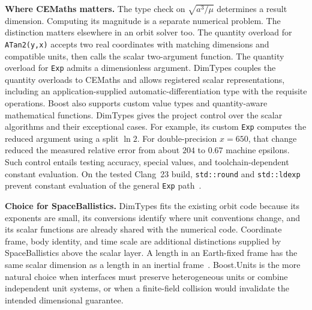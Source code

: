 \documentclass[11pt,a4paper]{article}
\newcommand{\code}[1]{\texttt{#1}}
\begin{document}
\textbf{Where CEMaths matters.}
The type check on $\sqrt{a^3/\mu}$ determines a result dimension.
Computing its magnitude is a separate numerical problem. The distinction
matters elsewhere in an orbit solver too. The quantity overload for
\code{ATan2(y,x)} accepts two real coordinates with matching dimensions and
compatible units, then calls the scalar two-argument function. The quantity
overload for \code{Exp} admits a dimensionless argument. DimTypes couples
the quantity overloads to CEMaths and allows registered scalar
representations, including an application-supplied automatic-differentiation
type with the requisite operations. Boost also supports custom value types
and quantity-aware mathematical functions. DimTypes gives the project control
over the scalar algorithms and their exceptional cases. For example, its
custom \code{Exp} computes the reduced argument using a split $\ln 2$.
For double-precision $x=650$, that change reduced the measured relative error
from about $204$ to $0.67$ machine epsilons. Such control entails testing
accuracy, special values, and toolchain-dependent constant evaluation. On
the tested Clang~23 build, \code{std::round} and \code{std::ldexp} prevent
constant evaluation of the general \code{Exp} path~\cite{dimtypes,boostexamples}.

\textbf{Choice for SpaceBallistics.}
DimTypes fits the existing orbit code because its exponents are small, its
conversions identify where unit conventions change, and its scalar functions
are already shared with the numerical code. Coordinate frame, body identity,
and time scale are additional distinctions supplied by SpaceBallistics above
the scalar layer. A length in an Earth-fixed frame has the same scalar
dimension as a length in an inertial frame~\cite{merkin}. Boost.Units is the
more natural choice when interfaces must preserve heterogeneous units or
combine independent unit systems, or when a finite-field collision would
invalidate the intended dimensional guarantee.
\end{document}
